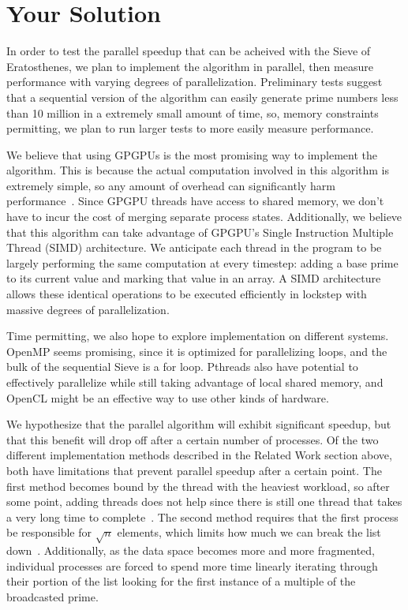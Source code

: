 \documentclass[11pt]{article}
\begin{document}
\section {Your Solution}\label{soln}

In order to test the parallel speedup that can be acheived with
the Sieve of Eratosthenes, we plan to implement the algorithm in parallel,
then measure performance with varying degrees of parallelization.
Preliminary tests suggest that a sequential version of the algorithm
can easily generate prime numbers less than 10 million in a extremely
small amount of time, so, memory constraints permitting, we plan to
run larger tests to more easily measure performance.

We believe that using GPGPUs is the most promising way to implement
the algorithm. This is because the actual computation involved in this algorithm
is extremely simple, so any amount of overhead can significantly harm
performance~\cite{Bohkari}. %
Since GPGPU threads have access to shared memory, we don't have to
incur the cost of merging separate process states. Additionally,
we believe that this algorithm can take advantage of GPGPU's
Single Instruction Multiple Thread (SIMD) architecture. We anticipate
each thread in the program to be largely performing the same computation
at every timestep: adding a base prime to its current value and marking
that value in an array. A SIMD architecture allows these identical operations
to be executed efficiently in lockstep with massive degrees of parallelization.

Time permitting, we also hope to explore implementation on different systems.
OpenMP seems promising, since it is optimized for parallelizing loops, and
the bulk of the sequential Sieve is a for loop. Pthreads also have potential
to effectively parallelize while still taking advantage of local shared memory,
and OpenCL might be an effective way to use other kinds of hardware.

We hypothesize that the parallel algorithm will exhibit significant speedup,
but that this benefit will drop off after a certain number of processes.
Of the two different implementation methods described in the Related Work
section above, both have limitations that prevent parallel speedup after a
certain point. The first method becomes bound by the thread with the heaviest
workload, so after some point, adding threads does not help since there is still
one thread that takes a very long time to complete~\cite{Bohkari}.
The second method requires that
the first process be responsible for $\sqrt{n}$ elements, which limits how
much we can break the list down~\cite{Bhat}.
Additionally, as the data space becomes
more and more fragmented, individual processes are forced to spend more time
linearly iterating through their portion of the list looking for the first
instance of a multiple of the broadcasted prime.
\end{document}

